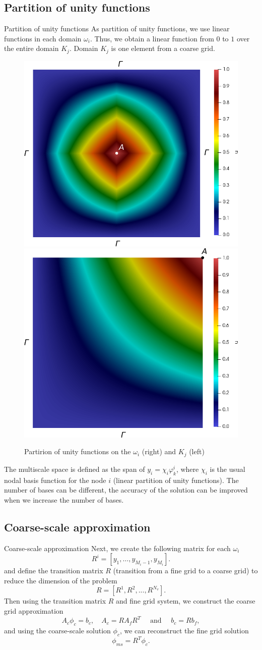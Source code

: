 \documentclass[10pt,pdf,hyperref={unicode}]{beamer}
\begin{document}
\subsection{Partition of unity functions}
	\begin{frame}{Partition of unity functions}
		As  partition of unity functions, we use linear functions in each domain $\omega_i$.
		Thus, we obtain a linear function from $0$ to $1$ over the entire domain $K_j$. 
		Domain $K_j$ is one element from a coarse grid. 
		\begin{figure}[h]
			\centering
			\includegraphics[width=0.3\linewidth]{pofs.png} 
			\hspace{2em}
			\includegraphics[width=0.3\linewidth]{pouK.png} 
			\caption{Partirion of unity functions on the $\omega_i$ (right) and $K_j$ (left)}
		\end{figure} 
	
		The multiscale space is defined as the span of $y_i = \chi_i \varphi^i_k$, where $\chi_i$ is the usual nodal basis function for the node $i$ (linear partition of unity functions). 
		The number of bases can be different, the accuracy of the solution can be improved when we increase the number of bases.
	\end{frame}

\subsection{Coarse-scale approximation}
	\begin{frame}{Coarse-scale approximation}
		Next, we create the following  matrix for each $\omega_i$
		\[
			R^i = \left[ y_1, \ldots, y_{M_i-1},  y_{M_i} \right].
		\]
		and define the transition matrix $R$ (transition from a fine grid to a coarse grid) to reduce the dimension of the problem
		\[
			R = [ R^1, R^2, ..., R^{N_v} ].
		\]
		Then using the transition matrix $R$ and fine grid system, we construct the coarse grid approximation
		\[
			A_c \phi_c = b_c, \quad 
			A_c = R A_f R^T 
			\quad \text{ and } \quad 
			b_c = R b_f,
		\]
		and using the coarse-scale solution $\phi_c$, we can  reconstruct the fine grid solution 
		\[
			\phi_{ms} = R^T \phi_c.
		\]
\end{frame}
\end{document}
